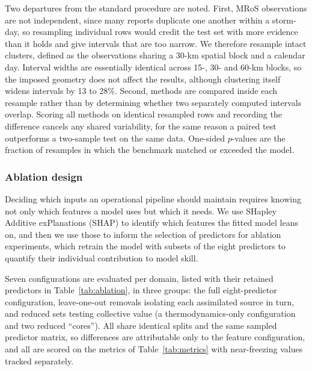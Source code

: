 \documentclass[twocol]{ametsocV6.1} %
\begin{document}
Two departures from the standard procedure are noted. First, MRoS
observations are not independent, since many reports duplicate one
another within a storm-day, so resampling individual rows would credit
the test set with more evidence than it holds and give intervals that
are too narrow. We therefore resample intact clusters, defined as the
observations sharing a 30-km spatial block and a calendar day. Interval
widths are essentially identical across 15-, 30- and 60-km blocks, so
the imposed geometry does not affect the results, although clustering
itself widens intervals by 13 to 28\%. Second, methods are compared
inside each resample rather than by determining whether two separately
computed intervals overlap. Scoring all methods on identical resampled 
rows and recording the difference cancels
any shared variability, for the same reason a paired test outperforms a
two-sample test on the same data. One-sided $p$-values are the fraction
of resamples in which the benchmark matched or exceeded the model.

\subsubsection{Ablation design}
\label{sec:ablation-methods}
Deciding which inputs an operational pipeline should maintain requires
knowing not only which features a model uses but which it needs. We use
SHapley Additive exPlanations (SHAP) \citep{lundberg2020} to identify
which features the fitted model leans on, and then we use those to inform the 
selection of predictors for ablation experiments, which retrain the model 
with subsets of the eight predictors to quantify their individual 
contribution to model skill.

Seven configurations are evaluated per domain, listed with their
retained predictors in Table~\ref{tab:ablation}, in three groups: the
full eight-predictor configuration, leave-one-out removals isolating
each assimilated source in turn, and reduced sets testing collective
value (a thermodynamics-only configuration and two reduced ``cores''). All
share identical splits and the same sampled predictor matrix, so
differences are attributable only to the feature configuration, and all
are scored on the metrics of Table~\ref{tab:metrics} with near-freezing
values tracked separately.
\end{document}
